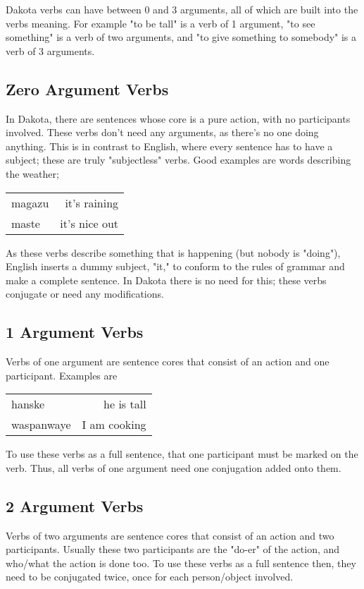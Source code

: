 \documentclass[10pt,letter]{article} %
\begin{document}
Dakota verbs can have between 0 and 3 arguments, all of which are built into the verbs meaning.  For example "to be tall" is a verb of 1 argument, "to see something" is a verb of two arguments, and "to give something to somebody" is a verb of 3 arguments.


	\subsection{Zero  Argument Verbs}
In Dakota, there are sentences whose core is a pure action, with no participants involved.  These verbs don't need any arguments, as there's no one doing anything.  This is in contrast to English, where every sentence has to have a subject; these are truly "subjectless" verbs.  Good examples are words describing the weather;

\begin{center}
\begin{tabular}{ l r }
  magazu & it's raining\\
  maste & it's nice out \\
\end{tabular}
\end{center}

As these verbs describe something that is happening (but nobody is "doing"), English inserts a dummy subject, "it," to conform to the rules of grammar and make a complete sentence.  In Dakota there is no need for this; these verbs conjugate or need any modifications.





	\subsection{1 Argument Verbs}
Verbs of one argument are sentence cores that consist of an action and one participant. Examples are

\begin{center}
\begin{tabular}{ l r }
  hanske & he is tall \\
waspanwaye & I am cooking
\end{tabular}
\end{center}

To use these verbs as a full sentence, that one participant must be marked on the verb.  Thus, all verbs of one argument need one conjugation added onto them.  




	\subsection{2 Argument Verbs}
Verbs of two arguments are sentence cores that consist of an action and two participants.  Usually these two participants are the "do-er" of the action, and who/what the action is done too. To use these verbs as a full sentence then, they need to be conjugated twice, once for each person/object involved.
\end{document}
